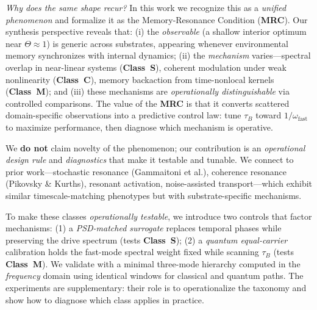 \documentclass[11pt,letterpaper]{article}
\DeclareRobustCommand{\mrc}{\textbf{MRC}\xspace}
\DeclareRobustCommand{\classS}{\textbf{Class~S}\xspace}
\DeclareRobustCommand{\classC}{\textbf{Class~C}\xspace}
\DeclareRobustCommand{\classM}{\textbf{Class~M}\xspace}
\begin{document}
\emph{Why does the same shape recur?} In this work we recognize this as a \emph{unified phenomenon} and formalize it as the Memory-Resonance Condition (\mrc). Our synthesis perspective reveals that: (i) the \emph{observable} (a shallow interior optimum near $\Theta\!\approx\!1$) is generic across substrates, appearing whenever environmental memory synchronizes with internal dynamics; (ii) the \emph{mechanism} varies---spectral overlap in near-linear systems (\classS), coherent modulation under weak nonlinearity (\classC), memory backaction from time-nonlocal kernels (\classM); and (iii) these mechanisms are \emph{operationally distinguishable} via controlled comparisons. The value of the \mrc is that it converts scattered domain-specific observations into a predictive control law: tune $\tau_B$ toward $1/\omega_{\mathrm{fast}}$ to maximize performance, then diagnose which mechanism is operative.

We \textbf{do not} claim novelty of the phenomenon; our contribution is an \emph{operational design rule} and \emph{diagnostics} that make it testable and tunable. We connect to prior work---stochastic resonance (Gammaitoni et al.), coherence resonance (Pikovsky \& Kurths), resonant activation, noise-assisted transport---which exhibit similar timescale-matching phenotypes but with substrate-specific mechanisms.

To make these classes \emph{operationally testable}, we introduce two controls that factor mechanisms: (1) a \emph{PSD-matched surrogate} replaces temporal phases while preserving the drive spectrum (tests \classS); (2) a \emph{quantum equal-carrier} calibration holds the fast-mode spectral weight fixed while scanning $\tau_B$ (tests \classM). We validate with a minimal three-mode hierarchy computed in the \emph{frequency} domain using identical windows for classical and quantum paths. The experiments are supplementary: their role is to operationalize the taxonomy and show how to diagnose which class applies in practice.
\end{document}
